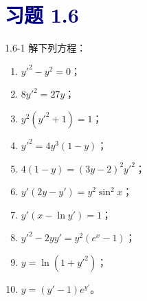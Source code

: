 \documentclass[UTF8,a4paper,11pt]{ctexart}
\newcommand{\sect}[1]{\section*{\textcolor{navy}{习题 #1}}}
\begin{document}
\sect{1.6}
\begin{problem}{1.6-1}
解下列方程：
  \begin{enumerate}[label=(\arabic*)]
    \item $\displaystyle y'^2-y^2=0$；
    \item $\displaystyle 8y'^2=27y$；
    \item $\displaystyle y^2(y'^2+1)=1$；
    \item $\displaystyle y'^2=4y^3(1-y)$；
    \item $\displaystyle 4(1-y)=(3y-2)^2y'^2$；
    \item $\displaystyle y'(2y-y')=y^2\sin^2x$；
    \item $\displaystyle y'(x-\ln y')=1$；
    \item $\displaystyle y'^2-2yy'=y^2(e^x-1)$；
    \item $\displaystyle y=\ln(1+y'^2)$；
    \item $\displaystyle y=(y'-1)e^{y'}$。
  \end{enumerate}
\end{problem}
\end{document}
